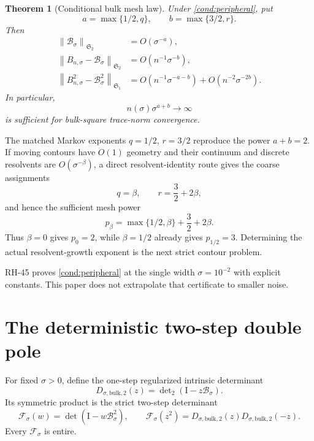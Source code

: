 \documentclass[11pt]{article}
\newtheorem{theorem}{Theorem}[section]
\theoremstyle{definition}
\theoremstyle{remark}
\newcommand{\Id}{\mathrm I}
\newcommand{\cB}{\mathcal B}
\newcommand{\cF}{\mathcal F}
\newcommand{\norm}[1]{\left\lVert #1\right\rVert}
\newcommand{\detF}{\operatorname{det}}
\newcommand{\Dettwo}{\operatorname{det}\nolimits_2}
\begin{document}
\begin{theorem}[Conditional bulk mesh law]
\label{thm:conditional-bulk}
Under \cref{cond:peripheral}, put
\begin{equation}
 a=\max\{1/2,q\},
 \qquad
 b=\max\{3/2,r\}.
 \label{eq:ab-powers}
\end{equation}
Then
\begin{align}
 \norm{\cB_\sigma}_{\mathfrak S_2}&=O(\sigma^{-a}),
 \label{eq:bulk-size-conditional}\\
 \norm{B_{n,\sigma}-\cB_\sigma}_{\mathfrak S_2}
 &=O(n^{-1}\sigma^{-b}),
 \label{eq:bulk-error-conditional}\\
 \norm{B_{n,\sigma}^2-\cB_\sigma^2}_{\mathfrak S_1}
 &=O(n^{-1}\sigma^{-a-b})
   +O(n^{-2}\sigma^{-2b}).
 \label{eq:bulk-square-conditional}
\end{align}
In particular,
\begin{equation}
 n(\sigma)\sigma^{a+b}\to\infty
 \label{eq:bulk-sufficient-power}
\end{equation}
is sufficient for bulk-square trace-norm convergence.
\end{theorem}

The matched Markov exponents $q=1/2$, $r=3/2$ reproduce the power $a+b=2$.
If moving contours have $O(1)$ geometry and their continuum and discrete
resolvents are $O(\sigma^{-\beta})$, a direct resolvent-identity route gives
the coarse assignments
\begin{equation}
 q=\beta,
 \qquad
 r=\frac32+2\beta,
 \label{eq:beta-route}
\end{equation}
and hence the sufficient mesh power
\begin{equation}
 p_\beta
 =\max\{1/2,\beta\}+\frac32+2\beta.
 \label{eq:beta-power}
\end{equation}
Thus $\beta=0$ gives $p_0=2$, while $\beta=1/2$ already gives $p_{1/2}=3$.
Determining the actual resolvent-growth exponent is the next strict contour
problem.

RH-45 proves \cref{cond:peripheral} at the single width
$\sigma=10^{-2}$ with explicit constants.  This paper does not extrapolate
that certificate to smaller noise.

\section{The deterministic two-step double pole}
\label{sec:double-pole}

For fixed $\sigma>0$, define the one-step regularized intrinsic determinant
\begin{equation}
 D_{\sigma,\mathrm{bulk},2}(z)
 =\Dettwo(\Id-z\cB_\sigma).
 \label{eq:noisy-det2}
\end{equation}
Its symmetric product is the strict two-step determinant
\begin{equation}
 \cF_\sigma(w)
 =\detF(\Id-w\cB_\sigma^2),
 \qquad
 \cF_\sigma(z^2)
 =D_{\sigma,\mathrm{bulk},2}(z)
  D_{\sigma,\mathrm{bulk},2}(-z).
 \label{eq:symmetric-product}
\end{equation}
Every $\cF_\sigma$ is entire.
\end{document}
